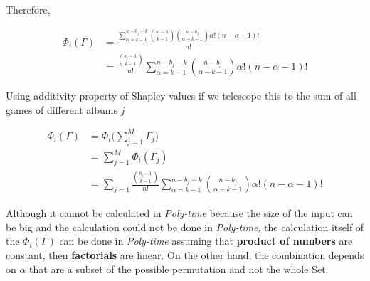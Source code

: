 \documentclass[12pt, a4paper]{article}
\begin{document}
Therefore,

\begin{subequations}
  \begin{align} 
    \Phi_i(\Gamma) &= \frac{\sum_{\alpha = k -1}^{n-b_j-k} \binom{b_j - 1}{k-1}\binom{n-b_j}{\alpha - k - 1} \alpha! (n - \alpha - 1)!}{n!}\\
                   &= \frac{\binom{b_j - 1}{k-1}}{n!} \sum_{\alpha = k -1}^{n-b_j-k} \binom{n-b_j}{\alpha - k - 1} \alpha! (n - \alpha - 1)!
  \end{align}
\end{subequations}


Using additivity property of Shapley values if we telescope this to the sum of all games of different albums $j$

\begin{subequations}
  \begin{align}    
  \Phi_i(\Gamma) &= \Phi_i\bigr(\sum_{j=1}^M \Gamma_j\bigl)\\
                 &= \sum_{j=1}^M \Phi_i(\Gamma_j)\\
                 &= \sum_{j=1} \frac{\binom{b_j - 1}{k-1}}{n!} \sum_{\alpha = k -1}^{n-b_j-k} \binom{n-b_j}{\alpha - k - 1} \alpha! (n - \alpha - 1)!
  \end{align}
\end{subequations}

Although it cannot be calculated in \textit{Poly-time} because the size of the input can be big and the calculation could not be done in \textit{Poly-time},
the calculation itself of the $\Phi_i(\Gamma)$ can be done in \textit{Poly-time} assuming that \textbf{product of numbers} are constant, then \textbf{factorials} are linear.
On the other hand, the combination depends on $\alpha$ that are a subset of the possible permutation and not the whole Set.
\end{document}
